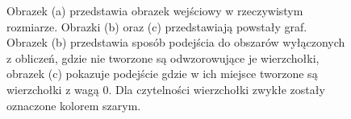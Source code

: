 \begin{figure}[h]
\centering
\begin{subfigure}{.2\textwidth}
    \centering
    \caption[short]{}
\end{subfigure}%
\begin{subfigure}{.38\textwidth}
    \centering
    \caption[short]{}
\end{subfigure}%
\begin{subfigure}{.38\textwidth}
    \centering
    \caption[short]{}
\end{subfigure}
\caption{Obrazek (a) przedstawia obrazek wejściowy w rzeczywistym rozmiarze. Obrazki (b) oraz (c) przedstawiają
powstały graf. Obrazek (b) przedstawia sposób podejścia do obszarów wyłączonych z obliczeń, gdzie nie tworzone są
odwzorowujące je wierzchołki, obrazek (c) pokazuje podejście gdzie w ich miejsce tworzone są wierzchołki z wagą $0$.
Dla czytelności wierzchołki zwykłe zostały oznaczone kolorem szarym. }
\label{im:input2}
\end{figure}

